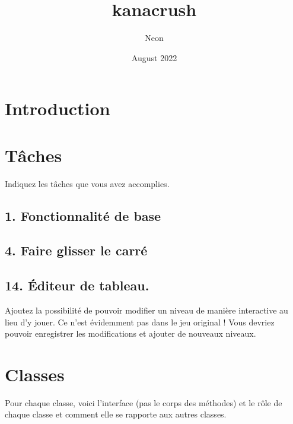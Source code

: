 \documentclass{article}
\title{kanacrush}
\author{Neon }
\date{August 2022}
\begin{document}
    \maketitle
    \tableofcontents
    \newpage


    \section{Introduction}
    \section{Tâches }
    Indiquez les tâches que vous avez accomplies.

    \subsection{1. Fonctionnalité de base}
    \subsection{4. Faire glisser le carré}
    \subsection{14. Éditeur de tableau.  }
    Ajoutez la possibilité de pouvoir modifier un niveau de manière
    interactive au lieu d’y jouer. Ce n’est évidemment pas dans le jeu original ! Vous devriez
    pouvoir enregistrer les modifications et ajouter de nouveaux niveaux.
    \section{Classes }
    Pour chaque classe, voici l’interface (pas le corps des méthodes) et  le rôle de chaque classe et comment elle se rapporte aux autres classes.
    \subsection{}
    \subsection{}
    \subsection{}
    \subsection{}
\end{document}
